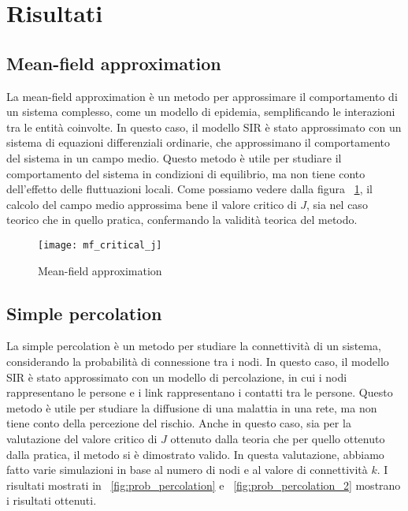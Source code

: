 \section{Risultati}\label{sec:risultati}

\subsection{Mean-field approximation}\label{subsec:res-mean-field-approximation}
    La mean-field approximation è un metodo per approssimare il comportamento di un sistema complesso, come un modello di
    epidemia, semplificando le interazioni tra le entità coinvolte.
    In questo caso, il modello SIR è stato approssimato con un sistema di equazioni differenziali ordinarie, che
    approssimano il comportamento del sistema in un campo medio.
    Questo metodo è utile per studiare il comportamento del sistema in condizioni di equilibrio, ma non tiene conto
    dell'effetto delle fluttuazioni locali.
    Come possiamo vedere dalla figura ~\ref{fig:mf_critical_j}, il calcolo del campo medio approssima bene il valore
    critico di $J$, sia nel caso teorico che in quello pratica, confermando la validità teorica del metodo.

    \begin{figure}[h]
        \texttt{[image: mf\_critical\_j]}\caption{Mean-field approximation}
        \label{fig:mf_critical_j}
    \end{figure}

\subsection{Simple percolation}\label{subsec:res-simple-percolation}
    La simple percolation è un metodo per studiare la connettività di un sistema, considerando la probabilità di
    connessione tra i nodi.
    In questo caso, il modello SIR è stato approssimato con un modello di percolazione, in cui i nodi rappresentano le
    persone e i link rappresentano i contatti tra le persone.
    Questo metodo è utile per studiare la diffusione di una malattia in una rete, ma non tiene conto della percezione
    del rischio.
    Anche in questo caso, sia per la valutazione del valore critico di $J$ ottenuto dalla teoria che per quello
    ottenuto dalla pratica, il metodo si è dimostrato valido.
    In questa valutazione, abbiamo fatto varie simulazioni in base al numero di nodi e al valore di connettività $k$.
    I risultati mostrati in ~\ref{fig:prob_percolation} e ~\ref{fig:prob_percolation_2} mostrano i risultati ottenuti.

